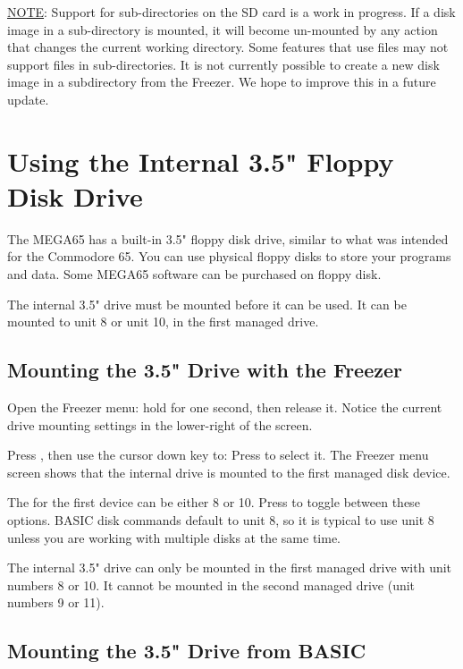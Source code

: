\underline{NOTE}: Support for sub-directories on the SD card is a work in progress. If a disk image in a sub-directory is mounted, it will become un-mounted by any action that changes the current working directory. Some features that use files may not support files in sub-directories. It is not currently possible to create a new disk image in a subdirectory from the Freezer. We hope to improve this in a future update.


\section{Using the Internal 3.5" Floppy Disk Drive}

The MEGA65 has a built-in 3.5" floppy disk drive, similar to what was intended for the Commodore 65. You can use physical floppy disks to store your programs and data. Some MEGA65 software can be purchased on floppy disk.

The internal 3.5" drive must be mounted before it can be used. It can be mounted to unit 8 or unit 10, in the first managed drive.

\subsection{Mounting the 3.5" Drive with the Freezer}

Open the Freezer menu: hold  for one second, then release it. Notice the current drive mounting settings in the lower-right of the screen.

Press , then use the cursor down key to:  Press  to select it. The Freezer menu screen shows that the internal drive is mounted to the first managed disk device.

The  for the first device can be either 8 or 10. Press  to toggle between these options. BASIC disk commands default to unit 8, so it is typical to use unit 8 unless you are working with multiple disks at the same time.

The internal 3.5" drive can only be mounted in the first managed drive with unit numbers 8 or 10. It cannot be mounted in the second managed drive (unit numbers 9 or 11).

\subsection{Mounting the 3.5" Drive from BASIC}

